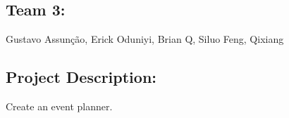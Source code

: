 \subsection*{Team 3\+:}

Gustavo Assunção, Erick Oduniyi, Brian Q, Siluo Feng, Qixiang

\subsection*{Project Description\+:}

Create an event planner. 